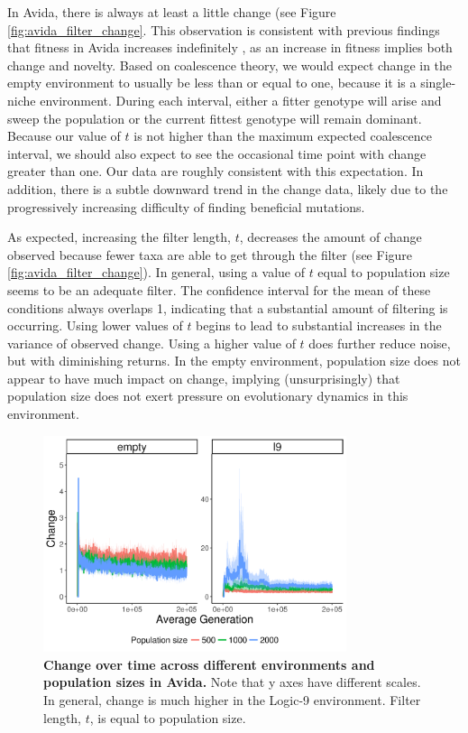 \documentclass[letterpaper]{article}
\providecommand{\DIFaddbeginFL}{} %
\providecommand{\DIFaddendFL}{} %
\providecommand{\DIFdelbeginFL}{} %
\providecommand{\DIFdelendFL}{} %
\begin{document}
In Avida, there is always at least a little change (see Figure \ref{fig:avida_filter_change}. This observation is consistent with previous findings that fitness in Avida increases indefinitely \citep{wiser_analysis_2015}, as an increase in fitness implies both change and novelty. Based on coalescence theory, we would expect change in the empty environment to usually be less than or equal to one, because it is a single-niche environment. During each interval, either a fitter genotype will arise and sweep the population or the current fittest genotype will remain dominant. Because our value of $t$ is not higher than the maximum expected coalescence interval, we should also expect to see the occasional time point with change greater than one. Our data are roughly consistent with this expectation. In addition, there is a subtle downward trend in the change data, likely due to the progressively increasing difficulty of finding beneficial mutations.

As expected, increasing the filter length, $t$, decreases the amount of change observed because fewer taxa are able to get through the filter (see Figure \ref{fig:avida_filter_change}). In general, using a value of $t$ equal to population size seems to be an adequate filter. The confidence interval for the mean of these conditions always overlaps 1, indicating that a substantial amount of filtering is occurring. Using lower values of $t$ begins to lead to substantial increases in the variance of observed change. Using a higher value of $t$ does further reduce noise, but with diminishing returns. In the empty environment, population size does not appear to have much impact on change, implying (unsurprisingly) that population size does not exert pressure on evolutionary dynamics in this environment.

\begin{figure}
    \centering
    \DIFdelbeginFL %
\DIFdelendFL \DIFaddbeginFL \includegraphics[width=3.5in]{figs/dolson.avida_env_change.png}
    \DIFaddendFL \caption{\textbf{Change over time across different environments and population sizes in Avida.} Note that y axes have different scales. In general, change is much higher in the Logic-9 environment. Filter length, $t$, is equal to population size.    \DIFdelbeginFL %
\DIFdelendFL \label{fig:avida_env_change}\DIFaddbeginFL }
\DIFaddendFL \end{figure}
\end{document}

